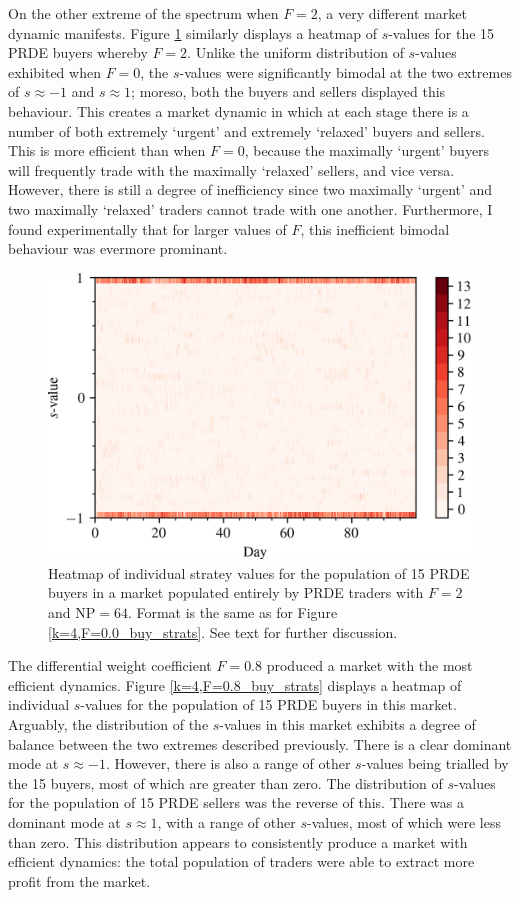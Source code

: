 \documentclass[conference]{IEEEtran}
\begin{document}
On the other extreme of the spectrum when $F=2$, a very different market dynamic manifests.
Figure \ref{k=4,F=2.0_buy_strats} similarly displays a heatmap of $s$-values for the 15 PRDE buyers whereby $F=2$.
Unlike the uniform distribution of $s$-values exhibited when $F=0$, the $s$-values were significantly bimodal at the two extremes of $s\approx-1$ and $s\approx1$; moreso, both the buyers and sellers displayed this behaviour.
This creates a market dynamic in which at each stage there is a number of both extremely `urgent' and extremely `relaxed' buyers and sellers.
This is more efficient than when $F=0$, because the maximally `urgent' buyers will frequently trade with the maximally `relaxed' sellers, and vice versa.
However, there is still a degree of inefficiency since two maximally `urgent' and two maximally `relaxed' traders cannot trade with one another.
Furthermore, I found experimentally that for larger values of $F$, this inefficient bimodal behaviour was evermore prominant.

\begin{figure}[htbp]
    \centerline{\includegraphics[width=\columnwidth]{k=4,F=2.0_buy_strats.png}}
    \caption{
        Heatmap of individual stratey values for the population of 15 PRDE buyers in a market populated entirely by PRDE traders with $F=2$ and $\mathrm{NP}=64$.
        Format is the same as for Figure \ref{k=4,F=0.0_buy_strats}.
        See text for further discussion.
    }
    \label{k=4,F=2.0_buy_strats}
\end{figure}

The differential weight coefficient $F=0.8$ produced a market with the most efficient dynamics.
Figure \ref{k=4,F=0.8_buy_strats} displays a heatmap of individual $s$-values for the population of 15 PRDE buyers in this market.
Arguably, the distribution of the $s$-values in this market exhibits a degree of balance between the two extremes described previously.
There is a clear dominant mode at $s\approx-1$.
However, there is also a range of other $s$-values being trialled by the 15 buyers, most of which are greater than zero.
The distribution of $s$-values for the population of 15 PRDE sellers was the reverse of this.
There was a dominant mode at $s\approx 1$, with a range of other $s$-values, most of which were less than zero.
This distribution appears to consistently produce a market with efficient dynamics: the total population of traders were able to extract more profit from the market.
\end{document}
